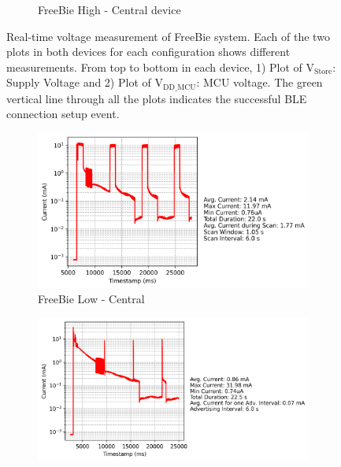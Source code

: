 \begin{figure}[t]
\begin{subfigure}{0.5\linewidth}
        \caption{\scriptsize{FreeBie High - Central device}}
    \end{subfigure}         
    \caption{Real-time voltage measurement of FreeBie system. Each of the two plots in both devices for each configuration shows different measurements. From top to bottom in each device, 1) Plot of \(\text{V}_\text{Store}\): Supply Voltage and 2) Plot of \(\text{V}_\text{DD\_MCU}\): MCU voltage. The green vertical line through all the plots indicates the successful BLE connection setup event.}
    \label{fig:voltage_freebie}
\end{figure}
\begin{figure}[t]
    \begin{subfigure}{0.45\linewidth}
        \centering
        \includegraphics[width=\linewidth]{chapters/Results/Current vs Timestamp - FreeBie Central Low.png}
        \caption{FreeBie Low - Central}
        \label{fig:freebie_low_central}
        \vspace{1\baselineskip}
    \end{subfigure}\hfill
    \begin{subfigure}{0.45\linewidth}
        \centering
        \includegraphics[width=\linewidth]{chapters/Results/Current vs Timestamp - FreeBie Peripheral Low.png}

\end{subfigure}
\end{figure}
